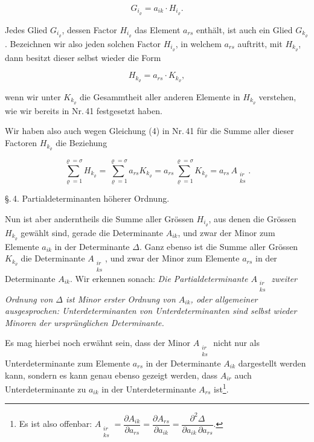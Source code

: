 \documentclass[11pt]{article}
\providecommand{\weberpage}[1]{}
\providecommand{\weq}[2]{\begin{equation}\tag{#1}#2\end{equation}}
\begin{document}
\weq{6}{G_{i_\varrho} = a_{ik}\cdot H_{i_\varrho}.}

Jedes Glied $G_{i_\varrho}$, dessen Factor $H_{i_\varrho}$ das Element $a_{rs}$ enthält, ist auch ein Glied $G_{k_\varrho}$. Bezeichnen wir also jeden solchen Factor $H_{i_\varrho}$, in welchem $a_{rs}$ auftritt, mit $H_{k_\varrho}$, dann besitzt dieser selbst wieder die Form

\weq{7}{H_{k_\varrho} = a_{rs}\cdot K_{k_\varrho},}

wenn wir unter $K_{k_\varrho}$ die Gesammtheit aller anderen Elemente in $H_{k_\varrho}$ verstehen, wie wir bereits in Nr.\,41 festgesetzt haben.

Wir haben also auch wegen Gleichung (4) in Nr.\,41 für die Summe aller dieser Factoren $H_{k_\varrho}$ die Beziehung

\[
\sum_{\varrho=1}^{\varrho=\sigma} H_{k_\varrho} = \sum_{\varrho=1}^{\varrho=\sigma} a_{rs} K_{k_\varrho} = a_{rs}\sum_{\varrho=1}^{\varrho=\sigma} K_{k_\varrho} = a_{rs}\,A_{\substack{ir\\ks}}.
\]


\weberpage{49}
\S.\,4. Partialdeterminanten höherer Ordnung.

Nun ist aber anderntheils die Summe aller Grössen $H_{i_\varrho}$, aus denen die Grössen $H_{k_\varrho}$ gewählt sind, gerade die Determinante $A_{ik}$, und zwar der Minor zum Elemente $a_{ik}$ in der Determinante $\varDelta$. Ganz ebenso ist die Summe aller Grössen $K_{k_\varrho}$ die Determinante $A_{\substack{ir\\ks}}$, und zwar der Minor zum Elemente $a_{rs}$ in der Determinante $A_{ik}$. Wir erkennen sonach: \textit{Die Partialdeterminante $A_{\substack{ir\\ks}}$ zweiter Ordnung von $\varDelta$ ist Minor erster Ordnung von $A_{ik}$, oder allgemeiner ausgesprochen: Unterdeterminanten von Unterdeterminanten sind selbst wieder Minoren der ursprünglichen Determinante.}

Es mag hierbei noch erwähnt sein, dass der Minor $A_{\substack{ir\\ks}}$ nicht nur als Unterdeterminante zum Elemente $a_{rs}$ in der Determinante $A_{ik}$ dargestellt werden kann, sondern es kann genau ebenso gezeigt werden, dass $A_{ir}$ auch Unterdeterminante zu $a_{ik}$ in der Unterdeterminante $A_{rs}$ ist\footnote{Es ist also offenbar: $A_{\substack{ir\\ks}} = \dfrac{\partial A_{ik}}{\partial a_{rs}} = \dfrac{\partial A_{rs}}{\partial a_{ik}} = \dfrac{\partial^2 \varDelta}{\partial a_{ik}\,\partial a_{rs}}$.}.
\end{document}

